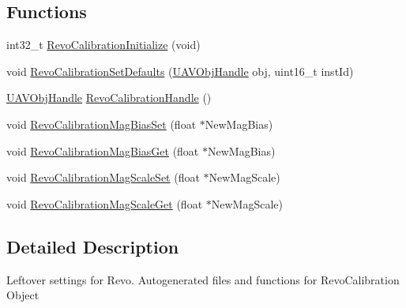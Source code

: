 \subsection*{\-Functions}
\begin{DoxyCompactItemize}
\item 
int32\-\_\-t \hyperlink{group___revo_calibration_gaa59ef87535d180d34f26a0e8058ef736}{\-Revo\-Calibration\-Initialize} (void)
\item 
void \hyperlink{group___revo_calibration_ga826a0dd8b0be68955104479f85ecb01a}{\-Revo\-Calibration\-Set\-Defaults} (\hyperlink{targets_2_u_a_v_objects_2inc_2uavobjectmanager_8h_a279053e22be53ce9f895043aaeb91e3b}{\-U\-A\-V\-Obj\-Handle} obj, uint16\-\_\-t inst\-Id)
\item 
\hyperlink{targets_2_u_a_v_objects_2inc_2uavobjectmanager_8h_a279053e22be53ce9f895043aaeb91e3b}{\-U\-A\-V\-Obj\-Handle} \hyperlink{group___revo_calibration_gaba21fcb0d8a528bf66af20fb420e6978}{\-Revo\-Calibration\-Handle} ()
\item 
void \hyperlink{group___revo_calibration_ga8d3305964876a30d165a08078d4cb086}{\-Revo\-Calibration\-Mag\-Bias\-Set} (float $\ast$\-New\-Mag\-Bias)
\item 
void \hyperlink{group___revo_calibration_ga2081dfa19e981432358dd5358406d88e}{\-Revo\-Calibration\-Mag\-Bias\-Get} (float $\ast$\-New\-Mag\-Bias)
\item 
void \hyperlink{group___revo_calibration_ga0234e0dccc5ccb124f81161418b6008c}{\-Revo\-Calibration\-Mag\-Scale\-Set} (float $\ast$\-New\-Mag\-Scale)
\item 
void \hyperlink{group___revo_calibration_ga8804433d5289a9f5817f9e0ae3c27dd6}{\-Revo\-Calibration\-Mag\-Scale\-Get} (float $\ast$\-New\-Mag\-Scale)
\end{DoxyCompactItemize}


\subsection{\-Detailed \-Description}
\-Leftover settings for \-Revo. \-Autogenerated files and functions for \-Revo\-Calibration \-Object 

